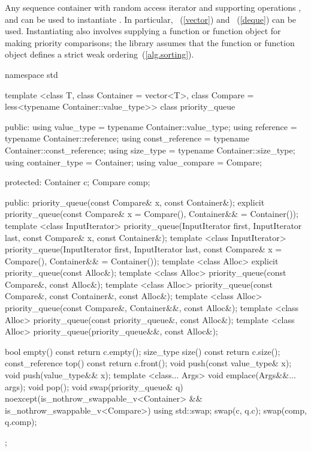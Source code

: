 \pnum
{}%
Any sequence container with random access iterator and supporting operations
,
and
can be used to instantiate
.
In particular,
~(\ref{vector})
and
~(\ref{deque})
can be used.
Instantiating
also involves supplying a function or function object for making
priority comparisons; the library assumes that the function or function
object defines a strict weak ordering~(\ref{alg.sorting}).

\begin{codeblock}
namespace std {
  template <class T, class Container = vector<T>,
    class Compare = less<typename Container::value_type>>
  class priority_queue {
  public:
    using value_type      = typename Container::value_type;
    using reference       = typename Container::reference;
    using const_reference = typename Container::const_reference;
    using size_type       = typename Container::size_type;
    using container_type  = Container;
    using value_compare   = Compare;

  protected:
    Container c;
    Compare comp;

  public:
    priority_queue(const Compare& x, const Container&);
    explicit priority_queue(const Compare& x = Compare(), Container&& = Container());
    template <class InputIterator>
      priority_queue(InputIterator first, InputIterator last,
             const Compare& x, const Container&);
    template <class InputIterator>
      priority_queue(InputIterator first, InputIterator last,
             const Compare& x = Compare(), Container&& = Container());
    template <class Alloc> explicit priority_queue(const Alloc&);
    template <class Alloc> priority_queue(const Compare&, const Alloc&);
    template <class Alloc> priority_queue(const Compare&, const Container&, const Alloc&);
    template <class Alloc> priority_queue(const Compare&, Container&&, const Alloc&);
    template <class Alloc> priority_queue(const priority_queue&, const Alloc&);
    template <class Alloc> priority_queue(priority_queue&&, const Alloc&);

    bool      empty() const       { return c.empty(); }
    size_type size()  const       { return c.size(); }
    const_reference   top() const { return c.front(); }
    void push(const value_type& x);
    void push(value_type&& x);
    template <class... Args> void emplace(Args&&... args);
    void pop();
    void swap(priority_queue& q) noexcept(is_nothrow_swappable_v<Container> &&
                                          is_nothrow_swappable_v<Compare>)
      { using std::swap; swap(c, q.c); swap(comp, q.comp); }
  };

}
\end{codeblock}
